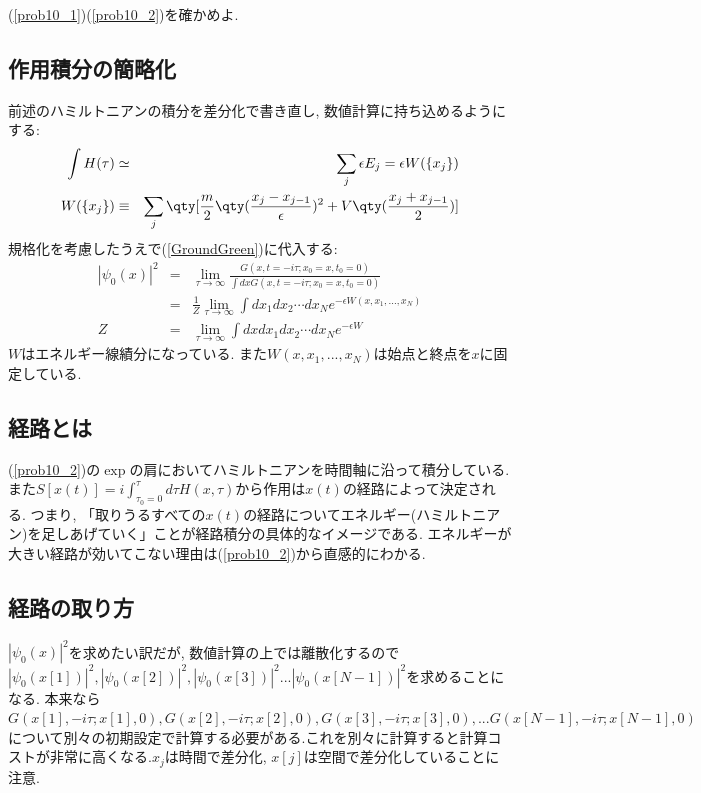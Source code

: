 \documentclass[10.5pt,a4paper]{jreport}
\begin{document}
 (\ref{prob10_1})(\ref{prob10_2})を確かめよ. \\

\subsection{作用積分の簡略化}
前述のハミルトニアンの積分を差分化で書き直し, 数値計算に持ち込めるようにする:
\begin{eqnarray}
  \int H(\tau) &\simeq& \sum_j\epsilon E_j = \epsilon W(\{x_j\})\\
  W(\{x_j\}) &\equiv& \sum_j\qty[\frac{m}{2}\qty(\frac{x_{j} - x_{j-1}}{\epsilon})^2 + V\qty(\frac{x_{j} + x_{j-1}}{2})]
\end{eqnarray}
規格化を考慮したうえで(\ref{GroundGreen})に代入する:
\begin{eqnarray}
  |\psi_0(x)|^2 &=& \lim_{\tau\rightarrow\infty}\frac{G(x, t=-i\tau;x_0=x, t_0=0)}{\int dx G(x, t=-i\tau;x_0=x, t_0=0)}\\
  &=&\frac{1}{Z}\lim_{\tau\rightarrow\infty}\int dx_1 dx_2\cdots dx_N e^{-\epsilon W(x, x_1,..., x_N)}\label{PsiW}\\
  Z &=& \lim_{\tau\rightarrow\infty}\int dx dx_1 dx_2\cdots dx_N e^{-\epsilon W}
\end{eqnarray}
$W$はエネルギー線績分になっている. また$W(x, x_1,..., x_N)$は始点と終点を$x$に固定している.
\subsection{経路とは}
(\ref{prob10_2})の$\exp$の肩においてハミルトニアンを時間軸に沿って積分している. また$S[x(t)] = i\int_{\tau_0=0}^{\tau}d\tau H(x, \tau)$から作用は$x(t)$の経路によって決定される. つまり, 「取りうるすべての$x(t)$の経路についてエネルギー(ハミルトニアン)を足しあげていく」ことが経路積分の具体的なイメージである. エネルギーが大きい経路が効いてこない理由は(\ref{prob10_2})から直感的にわかる. 
\subsection{経路の取り方}
$|\psi_0(x)|^2$を求めたい訳だが, 数値計算の上では離散化するので$|\psi_0(x[1])|^2, |\psi_0(x[2])|^2, |\psi_0(x[3])|^2 ... |\psi_0(x[N-1])|^2$を求めることになる. 本来なら$G(x[1], -i\tau; x[1], 0), G(x[2], -i\tau; x[2], 0), G(x[3], -i\tau; x[3], 0), ... G(x[N-1], -i\tau; x[N-1], 0)$について別々の初期設定で計算する必要がある.これを別々に計算すると計算コストが非常に高くなる.$x_j$は時間で差分化, $x[j]$は空間で差分化していることに注意.
\end{document}

